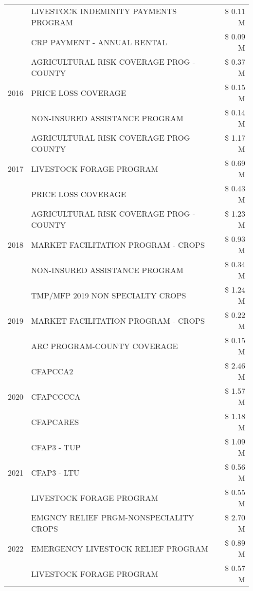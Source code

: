 \begin{tabular}{llr}
 & LIVESTOCK INDEMINITY PAYMENTS PROGRAM & \$ 0.11 M \\
 & CRP PAYMENT - ANNUAL RENTAL & \$ 0.09 M \\
\cline{1-3}
\multirow[t]{3}{*}{2016} & AGRICULTURAL RISK COVERAGE PROG - COUNTY & \$ 0.37 M \\
 & PRICE LOSS COVERAGE & \$ 0.15 M \\
 & NON-INSURED ASSISTANCE PROGRAM & \$ 0.14 M \\
\cline{1-3}
\multirow[t]{3}{*}{2017} & AGRICULTURAL RISK COVERAGE PROG - COUNTY & \$ 1.17 M \\
 & LIVESTOCK FORAGE PROGRAM & \$ 0.69 M \\
 & PRICE LOSS COVERAGE & \$ 0.43 M \\
\cline{1-3}
\multirow[t]{3}{*}{2018} & AGRICULTURAL RISK COVERAGE PROG - COUNTY & \$ 1.23 M \\
 & MARKET FACILITATION PROGRAM - CROPS & \$ 0.93 M \\
 & NON-INSURED ASSISTANCE PROGRAM & \$ 0.34 M \\
\cline{1-3}
\multirow[t]{3}{*}{2019} & TMP/MFP 2019 NON SPECIALTY CROPS & \$ 1.24 M \\
 & MARKET FACILITATION PROGRAM - CROPS & \$ 0.22 M \\
 & ARC PROGRAM-COUNTY COVERAGE & \$ 0.15 M \\
\cline{1-3}
\multirow[t]{3}{*}{2020} & CFAPCCA2 & \$ 2.46 M \\
 & CFAPCCCCA & \$ 1.57 M \\
 & CFAPCARES & \$ 1.18 M \\
\cline{1-3}
\multirow[t]{3}{*}{2021} & CFAP3 - TUP & \$ 1.09 M \\
 & CFAP3 - LTU & \$ 0.56 M \\
 & LIVESTOCK FORAGE PROGRAM & \$ 0.55 M \\
\cline{1-3}
\multirow[t]{3}{*}{2022} & EMGNCY RELIEF PRGM-NONSPECIALITY CROPS & \$ 2.70 M \\
 & EMERGENCY LIVESTOCK RELIEF PROGRAM & \$ 0.89 M \\
 & LIVESTOCK FORAGE PROGRAM & \$ 0.57 M \\
\cline{1-3}
\bottomrule
\end{tabular}
